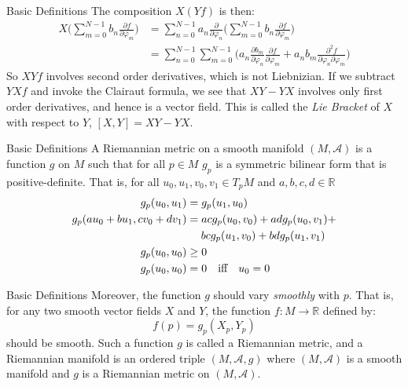 \documentclass{beamer}
\begin{document}
    \begin{frame}{Basic Definitions}
        The composition $X(Yf)$ is then:
        \begin{align}
            X\Big(
                \sum_{m=0}^{N-1}b_{n}\frac{\partial{f}}{\partial\varphi_{m}}
            \Big)
            &=\sum_{n=0}^{N-1}a_{n}\frac{\partial}{\partial\varphi_{n}}
            \Big(
                \sum_{m=0}^{N-1}b_{n}\frac{\partial{f}}{\partial\varphi_{m}}
            \Big)\\
            &=\sum_{n=0}^{N-1}\sum_{m=0}^{N-1}\Big(
                a_{n}\frac{\partial{b}_{m}}{\partial\varphi_{n}}
                \frac{\partial{f}}{\partial\varphi_{m}}+
                a_{n}b_{m}
                \frac{\partial^{2}{f}}{\partial\varphi_{n}\partial\varphi_{m}}
            \Big)
        \end{align}
        So $XYf$ involves second order derivatives, which is not Liebnizian.
        If we subtract $YXf$ and invoke the Clairaut formula, we see that
        $XY-YX$ involves only first order derivatives, and hence is a
        vector field. This is called the \textit{Lie Bracket} of $X$ with
        respect to $Y$, $[X,Y]=XY-YX$.
    \end{frame}
    \begin{frame}{Basic Definitions}
        A Riemannian metric on a smooth manifold $(M,\mathcal{A})$ is a
        function $g$ on $M$ such that for all $p\in{M}$
        $g_{p}$ is a symmetric bilinear form that is positive-definite. That
        is, for all $u_{0},u_{1},v_{0},v_{1}\in{T}_{p}M$ and
        $a,b,c,d\in\mathbb{R}$
        \begin{align}
            g_{p}(u_{0},u_{1})&=g_{p}(u_{1},u_{0})\\
            g_{p}(au_{0}+bu_{1},cv_{0}+dv_{1})
                &=acg_{p}(u_{0},v_{0})+adg_{p}(u_{0},v_{1})+\nonumber\\
                    &\hspace{1.3em}bcg_{p}(u_{1},v_{0})+bdg_{p}(u_{1},v_{1})\\
            g_{p}(u_{0},u_{0})&\geq{0}\\
            g_{p}(u_{0},u_{0})&=0\quad\textrm{iff}\quad{u}_{0}=0
        \end{align}
    \end{frame}
    \begin{frame}{Basic Definitions}
        Moreover, the function $g$ should vary \textit{smoothly} with $p$.
        That is, for any two smooth vector fields $X$ and $Y$, the function
        $f:M\rightarrow\mathbb{R}$ defined by:
        \begin{equation}
            f(p)=g_{p}(X_{p},Y_{p})
        \end{equation}
        should be smooth. Such a function $g$ is called a Riemannian metric,
        and a Riemannian manifold is an ordered triple
        $(M,\mathcal{A},g)$ where $(M,\mathcal{A})$ is a smooth manifold and
        $g$ is a Riemannian metric on $(M,\mathcal{A})$.
    \end{frame}
\end{document}
